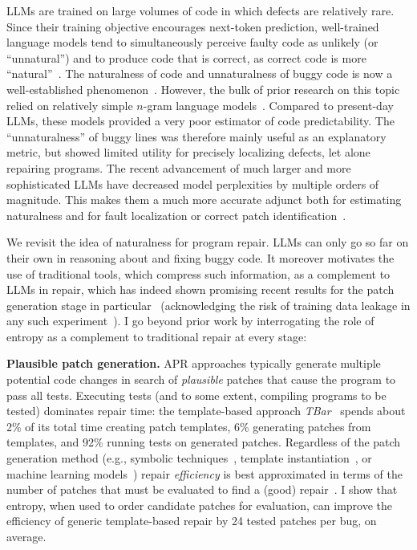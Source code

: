 \documentclass[12pt,openany,oneside,table]{cmuthesis}
\begin{document}
LLMs are trained on large volumes of code in which defects are relatively
rare. Since their training objective encourages next-token prediction,
well-trained language models tend to simultaneously perceive faulty code as unlikely
(or ``unnatural'') and to produce code that is correct, as correct code is more
``natural''~\cite{NAT}. The naturalness of code and unnaturalness of buggy 
code is now a well-established phenomenon~\cite{hindle2016naturalness,NAT}.
However, the bulk of prior research on this topic relied on relatively simple $n$-gram language
models~\cite{ngram}. Compared to present-day LLMs, these models provided a
very poor estimator of code predictability. The ``unnaturalness'' of
buggy lines was therefore mainly useful as an explanatory metric, but showed limited
utility for precisely localizing defects, let alone repairing programs.
The recent advancement of much larger and more sophisticated LLMs have decreased model
perplexities by multiple orders of magnitude. This makes them a much more accurate adjunct both for estimating naturalness and
for fault localization or correct patch identification~\cite{xia2023automated,
yang2023large}.

We revisit the idea of naturalness for program repair. 
LLMs can only go so far on their own in reasoning about and
fixing buggy code. It moreover motivates the use of traditional tools, which
compress such information, as a complement to LLMs in repair, which has indeed
shown promising recent results for the patch generation stage in
particular~\cite{xia2023automated} (acknowledging the risk of training data
leakage in any such experiment~\cite{balloccu2024leak}). 
I go beyond prior work by interrogating the role of entropy as a complement to
traditional repair at every stage:

\noindent\textbf{Plausible patch generation.} APR approaches
typically generate multiple potential code changes in search of 
\emph{plausible} patches that cause the program to pass all tests.
Executing tests (and to some extent, compiling programs to be tested) dominates
repair time: the template-based approach \textit{TBar}~\cite{TBar} spends about 2\% of
its total time creating patch templates, 6\% generating patches from templates,
and 92\% running tests on generated patches. Regardless of the patch generation method (e.g.,
symbolic techniques~\cite{patch-sim, claire_apr,angelix}, template instantiation~\cite{TBar, kim2022multi}, or
machine learning models~\cite{xia2023automated}) repair \emph{efficiency} is best
approximated in terms of the number of patches that must be evaluated to find a
(good) repair~\cite{efficiency}.
I show that entropy, when used to order candidate patches for evaluation, can
improve the efficiency of generic template-based repair by 24
tested patches per bug, on average.
\end{document}

